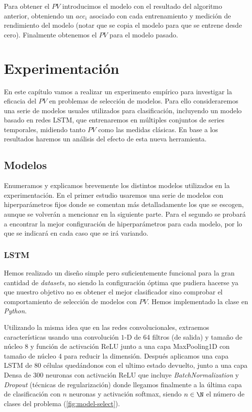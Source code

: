 Para obtener el $PV$ introducimos el modelo con el resultado del algoritmo anterior, obteniendo un $acc_i$ asociado con cada entrenamiento y medición de rendimiento del modelo (notar que se copia el modelo para que se entrene desde cero). Finalmente obtenemos el $PV$ para el modelo pasado.

\chapter{Experimentación}\label{ch:pv-experimentacion}

En este capítulo vamos a realizar un experimento empírico para investigar la eficacia del $PV$ en problemas de selección de modelos. Para ello consideraremos una serie de modelos usuales utilizados para clasificación, incluyendo un modelo basado en redes LSTM, que entrenaremos en múltiples conjuntos de series temporales, midiendo tanto $PV$ como las medidas clásicas. En base a los resultados haremos un análisis del efecto de esta nueva herramienta.

\section{Modelos}

Enumeramos y explicamos brevemente los distintos modelos utilizados en la experimentación. En el primer estudio usaremos una serie de modelos con hiperparámetros fijos donde se comentan más detalladamente los que se escogen, aunque se volverán a mencionar en la siguiente parte. Para el segundo se probará a encontrar la mejor configuración de hiperparámetros para cada modelo, por lo que se indicará en cada caso que se irá variando.

\subsection{LSTM}

Hemos realizado un diseño simple pero suficientemente funcional para la gran cantidad de \emph{datasets}, no siendo la configuración óptima que pudiera hacerse ya que nuestro objetivo no es obtener el mejor clasificador sino comprobar el comportamiento de selección de modelos con $PV$. Hemos implementado la clase en \emph{Python}.

Utilizando la misma idea que en las redes convolucionales, extraemos características usando una convolución $1$-D de 64 filtros (de salida) y tamaño de núcleo 8 y función de activación ReLU junto a una capa MaxPooling1D con tamaño de núcleo 4 para reducir la dimensión. Después aplicamos una capa LSTM de 80 células quedándonos con el ultimo estado devuelto, junto a una capa Densa de 300 neuronas con activación ReLU que incluye \emph{BatchNormalization} y \emph{Dropout} (técnicas de regularización) donde llegamos finalmente a la última capa de clasificación con $n$ neuronas y activación softmax, siendo $n \in \N$ el número de clases del problema (\autoref{fig:model-select}).

